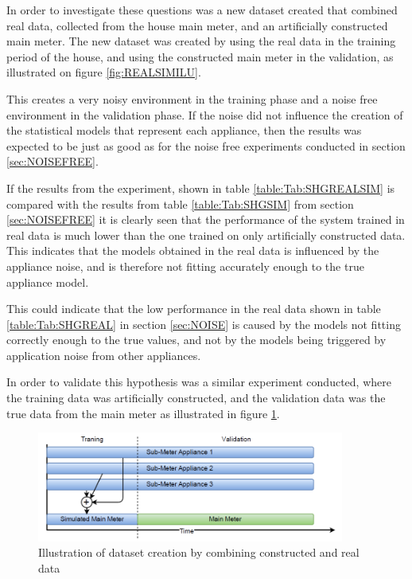 In order to investigate these questions was a new dataset created that combined real data, collected from the house main meter, and an artificially constructed main meter. The new dataset was created by using the real data in the training period of the house, and using the constructed main meter in the validation, as illustrated on figure \ref{fig:REALSIMILU}.

This creates a very noisy environment in the training phase and a noise free environment in the validation phase. If the noise did not influence the creation of the statistical models that represent each appliance, then the results was expected to be just as good as for the noise free experiments conducted in section \ref{sec:NOISEFREE}.




If the results from the experiment, shown in table \ref{table:Tab:SHGREALSIM} is compared with the results from table \ref{table:Tab:SHGSIM} from section \ref{sec:NOISEFREE} it is clearly seen that the performance of the system trained in real data is much lower than the one trained on only artificially constructed data. This indicates that the models obtained in the real data is influenced by the appliance noise, and is therefore not fitting accurately enough to the true appliance model. 

This could indicate that the low performance in the real data shown in table \ref{table:Tab:SHGREAL} in section \ref{sec:NOISE} is caused by the models not fitting correctly enough to the true values, and not by the models being triggered by application noise from other appliances.

In order to validate this hypothesis was a similar experiment conducted, where the training data was artificially constructed, and the validation data was the true data from the main meter as illustrated in figure \ref{fig:SHGSIMREAL}. 

\begin{figure}[H]
\centering
\includegraphics[width=0.9\textwidth]{billeder/SIMREAL.png}
\caption{Illustration of dataset creation by combining constructed and real data}
\label{fig:SHGSIMREAL}
\end{figure}

